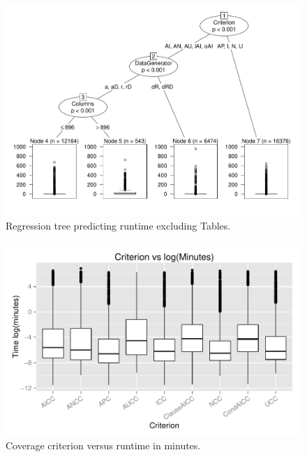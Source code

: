 \begin{figure}
\centering
  \centering
  \includegraphics[width=.75\linewidth]{diagrams/NoTableCtreesd.pdf}
  \caption{Regression tree predicting runtime excluding Tables.\vspace{-.15in}}
  \label{fig:ttree}
  \vspace{-.15in}
\end{figure}


\begin{figure}
\centering
  \centering
  \includegraphics[width=1\linewidth]{diagrams/CriterionvsTime.pdf}
  \caption{Coverage criterion versus runtime in minutes.\vspace{-.15in}}
  \label{fig:crites}
  \vspace{-.15in}
\end{figure}

